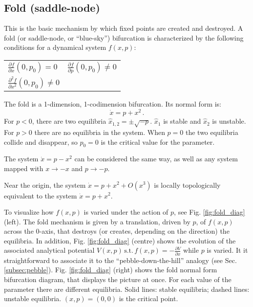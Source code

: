\tocless\subsection{Fold (saddle-node)}
\label{subsec:fold}
This is the basic mechanism by which fixed points are created and destroyed. A fold (or saddle-node, or ``blue-sky'') bifurcation is characterized by the following conditions for a dynamical system $f(x,p)$:

\begin{table}[h!]
	\centering
	\begin{tabular}{ll}
		$\frac{\partial f}{\partial x}(0,p_0)  = 0$ & $\frac{\partial f}{\partial p}(0,p_0) \neq 0$   \\
		$\frac{\partial^2 f}{\partial x^2}(0,p_0)  \neq 0$ &   
	\end{tabular}
\end{table}

\noindent The fold is a 1-dimension, 1-codimension bifurcation. Its normal form is:
\begin{equation}
	\dot{x} = p+x^2 \, .
	\label{eq:fold}
\end{equation}
For $p<0$, there are two equilibria $\hat{x}_{1,2} = \pm \sqrt{-p}$. $\hat{x}_1$ is stable and $\hat{x}_2$ is unstable. For $p>0$ there are no equilibria in the system. When $p=0$ the two equilibria collide and disappear, so $p_0 =0$ is the critical value for the parameter.
\begin{remark}
	The system $\dot{x} = p-x^2$ can be considered the same way, as well as any system mapped with $x \rightarrow -x$ and $p \rightarrow -p$.
	\label{rem:fold}
\end{remark}
\begin{lemma}
	Near the origin, the system $\dot{x} = p+x^2 + O(x^3)$ is locally topologically equivalent to the system $\dot{x} = p+x^2 $.
	\label{lemma:fold}
\end{lemma}

To visualize how $f(x,p)$ is varied under the action of $p$, see Fig. \ref{fig:fold_diag} (left). The fold mechanism is given by a translation, driven by $p$, of $f(x,p)$ across the 0-axis, that destroys (or creates, depending on the direction) the equilibria. In addition, Fig. \ref{fig:fold_diag} (centre) shows the evolution of the associated analytical potential $V(x,p) \, \text{s.t.} \, f(x,p) = - \frac{\partial V}{\partial x}$ while $p$ is varied. It it straightforward to associate it to the ``pebble-down-the-hill'' analogy (see Sec. \ref{subsec:pebble}).  Fig. \ref{fig:fold_diag} (right) shows the fold normal form bifurcation diagram, that displays the picture at once. For each value of the parameter there are different equilibria. Solid lines: stable equilibria; dashed lines: unstable equilibria. $(x,p)=(0,0)$ is the critical point.

